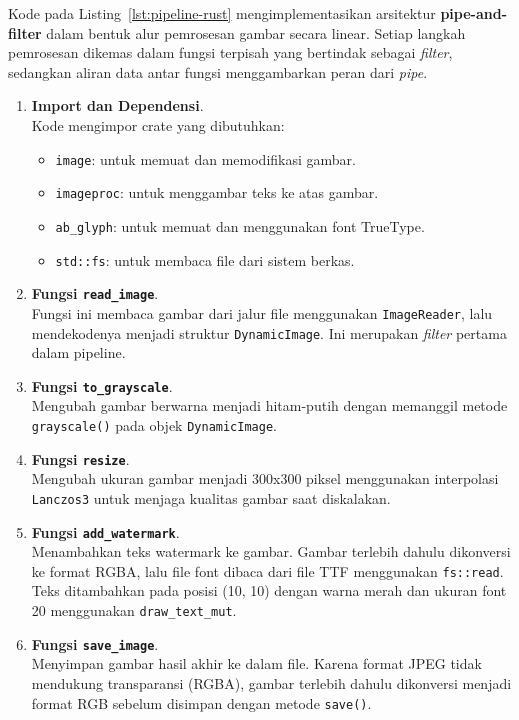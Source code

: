 Kode pada Listing~\ref{lst:pipeline-rust} mengimplementasikan arsitektur \textbf{pipe-and-filter} dalam bentuk alur pemrosesan gambar secara linear. Setiap langkah pemrosesan dikemas dalam fungsi terpisah yang bertindak sebagai \textit{filter}, sedangkan aliran data antar fungsi menggambarkan peran dari \textit{pipe}.

\begin{enumerate}
	\item \textbf{Import dan Dependensi}.\\
	Kode mengimpor crate yang dibutuhkan:
	\begin{itemize}
		\item \texttt{image}: untuk memuat dan memodifikasi gambar.
		\item \texttt{imageproc}: untuk menggambar teks ke atas gambar.
		\item \texttt{ab\_glyph}: untuk memuat dan menggunakan font TrueType.
		\item \texttt{std::fs}: untuk membaca file dari sistem berkas.
	\end{itemize}
	
	\item \textbf{Fungsi \texttt{read\_image}}.\\
	Fungsi ini membaca gambar dari jalur file menggunakan \texttt{ImageReader}, lalu mendekodenya menjadi struktur \texttt{DynamicImage}. Ini merupakan \textit{filter} pertama dalam pipeline.
	
	\item \textbf{Fungsi \texttt{to\_grayscale}}.\\
	Mengubah gambar berwarna menjadi hitam-putih dengan memanggil metode \texttt{grayscale()} pada objek \texttt{DynamicImage}.
	
	\item \textbf{Fungsi \texttt{resize}}.\\
	Mengubah ukuran gambar menjadi 300x300 piksel menggunakan interpolasi \texttt{Lanczos3} untuk menjaga kualitas gambar saat diskalakan.
	
	\item \textbf{Fungsi \texttt{add\_watermark}}.\\
	Menambahkan teks watermark ke gambar. Gambar terlebih dahulu dikonversi ke format RGBA, lalu file font dibaca dari file TTF menggunakan \texttt{fs::read}. Teks ditambahkan pada posisi (10, 10) dengan warna merah dan ukuran font 20 menggunakan \texttt{draw\_text\_mut}.
	
	\item \textbf{Fungsi \texttt{save\_image}}.\\
	Menyimpan gambar hasil akhir ke dalam file. Karena format JPEG tidak mendukung transparansi (RGBA), gambar terlebih dahulu dikonversi menjadi format RGB sebelum disimpan dengan metode \texttt{save()}.
	

\end{enumerate}
